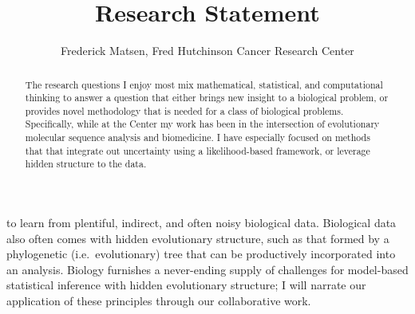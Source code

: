 \documentclass[hyper]{tufte-handout}
\title{Research Statement}
\author{Frederick Matsen, Fred Hutchinson Cancer Research Center} %
\begin{document}
\maketitle

\begin{abstract}
\noindent
The research questions I enjoy most mix mathematical, statistical, and computational thinking to answer a question that either brings new insight to a biological problem, or provides novel methodology that is needed for a class of biological problems.
Specifically, while at the Center my work has been in the intersection of evolutionary molecular sequence analysis and biomedicine.
I have especially focused on methods that that integrate out uncertainty using a likelihood-based framework, or leverage hidden structure to the data.
\end{abstract}





 to learn from plentiful, indirect, and often noisy biological data.
Biological data also often comes with hidden evolutionary structure, such as that formed by a phylogenetic (i.e.\ evolutionary) tree that can be productively incorporated into an analysis.
Biology furnishes a never-ending supply of challenges for model-based statistical inference with hidden evolutionary structure; I will narrate our application of these principles through our collaborative work.
\end{document}
